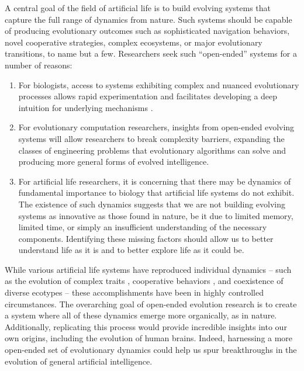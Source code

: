 \documentclass[letterpaper]{article}
\begin{document}
A central goal of the field of artificial life is to build evolving systems that capture the full range of dynamics from nature. Such systems should be capable of producing evolutionary outcomes such as sophisticated navigation behaviors, novel cooperative strategies, complex ecosystems, or major evolutionary transitions, to name but a few. Researchers seek such ``open-ended'' systems for a number of reasons:
\begin{enumerate}

\item For biologists, access to systems exhibiting complex and nuanced evolutionary processes allows rapid experimentation and facilitates developing a deep intuition for underlying mechanisms \citep{tenaillon_tempo_2016}.

\item For evolutionary computation researchers, insights from open-ended evolving systems will allow researchers to break complexity barriers, expanding the classes of engineering problems that evolutionary algorithms can solve \citep{Hara:1999vo, Potter:2000dw} and producing more general forms of evolved intelligence.

\item For artificial life researchers, it is concerning that there may be dynamics of fundamental importance to biology that artificial life systems do not exhibit. The existence of such dynamics suggests that we are not building evolving systems as innovative as those found in nature, be it due to limited memory, limited time, or simply an insufficient understanding of the necessary components.
Identifying these missing factors should allow us to better understand life as it is and to better explore life as it could be.

\end{enumerate}

While various artificial life systems have reproduced individual dynamics -- such as the evolution of complex traits \citep{Lenski:2003vy}, cooperative behaviors \citep{Goldsby:2012tz}, and coexistence of diverse ecotypes \citep{cooper_evolution_2003} -- these accomplishments have been in highly controlled circumstances. The overarching goal of open-ended evolution research is to create a system where all of these dynamics emerge more organically, as in nature. 
Additionally, replicating this process would provide incredible insights into our own origins, including the evolution of human brains. Indeed, harnessing a more open-ended set of evolutionary dynamics could help us spur breakthroughs in the evolution of general artificial intelligence.
\end{document}
